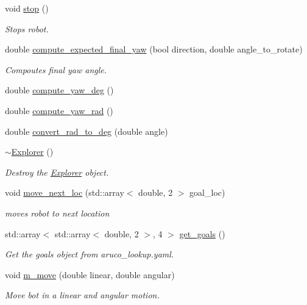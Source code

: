\begin{DoxyCompactItemize}
void \hyperlink{class_explorer_a0e4a623ff30d1886cc9f57ec081c527f}{stop} ()
\begin{DoxyCompactList}\small\item\em Stops robot. \end{DoxyCompactList}\item 
double \hyperlink{class_explorer_a02c37b93448ed474f1bf0d03e2758ca2}{compute\+\_\+expected\+\_\+final\+\_\+yaw} (bool direction, double angle\+\_\+to\+\_\+rotate)
\begin{DoxyCompactList}\small\item\em Compoutes final yaw angle. \end{DoxyCompactList}\item 
double \hyperlink{class_explorer_a670cdffdb8c3173c300590cfc45ab6d2}{compute\+\_\+yaw\+\_\+deg} ()
\item 
double \hyperlink{class_explorer_ac5b91cd64189a60ffe62535cb5bc093a}{compute\+\_\+yaw\+\_\+rad} ()
\item 
double \hyperlink{class_explorer_ac3a5c9368647dd9d2c36d12497bd889e}{convert\+\_\+rad\+\_\+to\+\_\+deg} (double angle)
\item 
\hyperlink{class_explorer_aa1b0a71e92e003e9162a5ba99d843392}{$\sim$\+Explorer} ()
\begin{DoxyCompactList}\small\item\em Destroy the \hyperlink{class_explorer}{Explorer} object. \end{DoxyCompactList}\item 
void \hyperlink{class_explorer_a2b0c1e46e1a17e99f4156edf5a93b691}{move\+\_\+next\+\_\+loc} (std\+::array$<$ double, 2 $>$ goal\+\_\+loc)
\begin{DoxyCompactList}\small\item\em moves robot to next location \end{DoxyCompactList}\item 
std\+::array$<$ std\+::array$<$ double, 2 $>$, 4 $>$ \hyperlink{class_explorer_a847e3ad2e7233d493a8dcfdd7139cb58}{get\+\_\+goals} ()
\begin{DoxyCompactList}\small\item\em Get the goals object from aruco\+\_\+lookup.\+yaml. \end{DoxyCompactList}\item 
void \hyperlink{class_explorer_ace304ef65547f4a3ff6458d934c54e87}{m\+\_\+move} (double linear, double angular)
\begin{DoxyCompactList}\small\item\em Move bot in a linear and angular motion. \end{DoxyCompactList}\end{DoxyCompactItemize}
